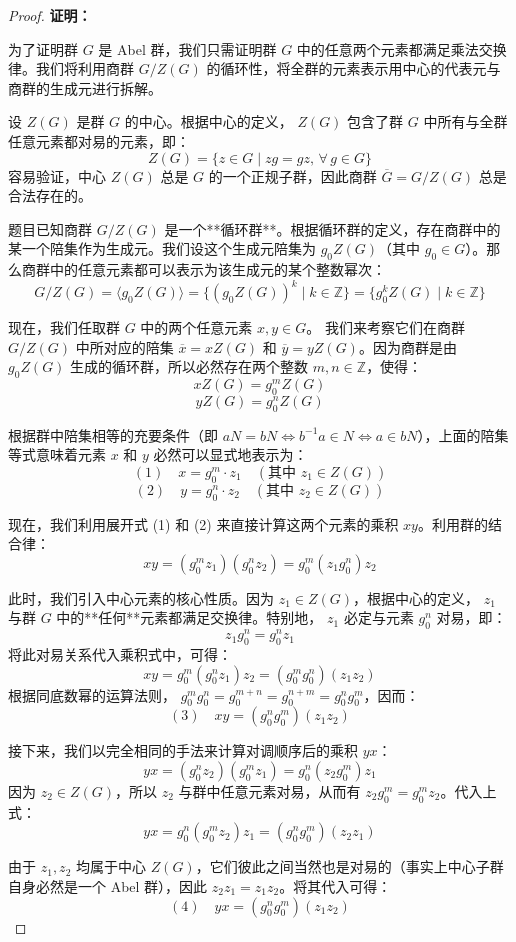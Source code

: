 \documentclass[]{article}
\begin{document}
\begin{proof}
\bigskip
\noindent \textbf{证明：} 

为了证明群 $G$ 是 Abel 群，我们只需证明群 $G$ 中的任意两个元素都满足乘法交换律。我们将利用商群 $G/Z(G)$ 的循环性，将全群的元素表示用中心的代表元与商群的生成元进行拆解。

\bigskip
设 $Z(G)$ 是群 $G$ 的中心。根据中心的定义， $Z(G)$ 包含了群 $G$ 中所有与全群任意元素都对易的元素，即：
\[ Z(G) = \{ z \in G \mid zg = gz, \, \forall \, g \in G \} \]
容易验证，中心 $Z(G)$ 总是 $G$ 的一个正规子群，因此商群 $\overline{G} = G / Z(G)$ 总是合法存在的。

题目已知商群 $G / Z(G)$ 是一个**循环群**。根据循环群的定义，存在商群中的某一个陪集作为生成元。我们设这个生成元陪集为 $g_0 Z(G)$（其中 $g_0 \in G$）。那么商群中的任意元素都可以表示为该生成元的某个整数幂次：
\[ G / Z(G) = \langle g_0 Z(G) \rangle = \{ (g_0 Z(G))^k \mid k \in \mathbb{Z} \} = \{ g_0^k Z(G) \mid k \in \mathbb{Z} \} \]

现在，我们任取群 $G$ 中的两个任意元素 $x, y \in G$。
我们来考察它们在商群 $G / Z(G)$ 中所对应的陪集 $\overline{x} = x Z(G)$ 和 $\overline{y} = y Z(G)$。因为商群是由 $g_0 Z(G)$ 生成的循环群，所以必然存在两个整数 $m, n \in \mathbb{Z}$，使得：
\[ x Z(G) = g_0^m Z(G) \]
\[ y Z(G) = g_0^n Z(G) \]

根据群中陪集相等的充要条件（即 $aN = bN \iff b^{-1}a \in N \iff a \in bN$），上面的陪集等式意味着元素 $x$ 和 $y$ 必然可以显式地表示为：
\[ (1) \quad x = g_0^m \cdot z_1 \quad (\text{其中 } z_1 \in Z(G)) \]
\[ (2) \quad y = g_0^n \cdot z_2 \quad (\text{其中 } z_2 \in Z(G)) \]

现在，我们利用展开式 (1) 和 (2) 来直接计算这两个元素的乘积 $xy$。利用群的结合律：
\[ xy = (g_0^m z_1) (g_0^n z_2) = g_0^m (z_1 g_0^n) z_2 \]

此时，我们引入中心元素的核心性质。因为 $z_1 \in Z(G)$，根据中心的定义， $z_1$ 与群 $G$ 中的**任何**元素都满足交换律。特别地， $z_1$ 必定与元素 $g_0^n$ 对易，即：
\[ z_1 g_0^n = g_0^n z_1 \]
将此对易关系代入乘积式中，可得：
\[ xy = g_0^m (g_0^n z_1) z_2 = (g_0^m g_0^n) (z_1 z_2) \]
根据同底数幂的运算法则， $g_0^m g_0^n = g_0^{m+n} = g_0^{n+m} = g_0^n g_0^m$，因而：
\[ (3) \quad xy = (g_0^n g_0^m) (z_1 z_2) \]

接下来，我们以完全相同的手法来计算对调顺序后的乘积 $yx$：
\[ yx = (g_0^n z_2) (g_0^m z_1) = g_0^n (z_2 g_0^m) z_1 \]
因为 $z_2 \in Z(G)$，所以 $z_2$ 与群中任意元素对易，从而有 $z_2 g_0^m = g_0^m z_2$。代入上式：
\[ yx = g_0^n (g_0^m z_2) z_1 = (g_0^n g_0^m) (z_2 z_1) \]

由于 $z_1, z_2$ 均属于中心 $Z(G)$，它们彼此之间当然也是对易的（事实上中心子群自身必然是一个 Abel 群），因此 $z_2 z_1 = z_1 z_2$。将其代入可得：
\[ (4) \quad yx = (g_0^n g_0^m) (z_1 z_2) \]


\end{proof}
\end{document}
